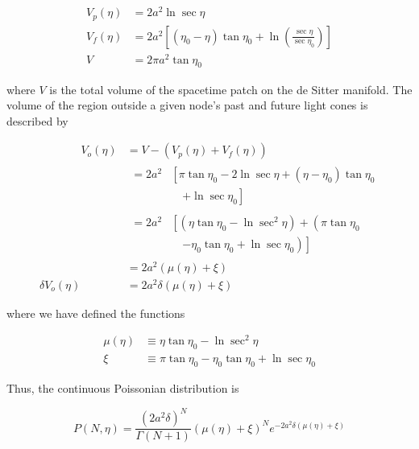 \documentclass[12pt]{article}
\begin{document}
\begin{equation}
\begin{split}
V_p\left(\eta\right) &= 2a^2\ln\sec\eta \\
V_f\left(\eta\right) &= 2a^2\left[\left(\eta_0-\eta\right)\tan\eta_0 + \ln\left(\frac{\sec\eta}{\sec\eta_0}\right)\right] \\
V &= 2\pi a^2 \tan\eta_0
\end{split}
\end{equation}

where $V$ is the total volume of the spacetime patch on the de Sitter manifold.  The volume of the region outside a given node's past and future light cones is described by

\begin{align}
\phantom{\delta V_0\left(\eta\right)}
V_o\left(\eta\right) &= V - \left(V_p\left(\eta\right)+V_f\left(\eta\right)\right) \\
  &\begin{aligned}
    = 2a^2 & \left[\pi\tan\eta_0 - 2\ln\sec\eta + \left(\eta-\eta_0\right)\tan\eta_0 \right. \\
    & \quad \left. + \ln\sec\eta_0 \right]
  \end{aligned} \\
  &\begin{aligned}
    = 2a^2 & \left[\left(\eta\tan\eta_0 - \ln\sec^2\eta\right) + \left(\pi\tan\eta_0 \right. \right. \\
    & \quad \left. \left. -\eta_0\tan\eta_0 + \ln\sec\eta_0\right)\right]
  \end{aligned} \\
  &= 2a^2 \left(\mu\left(\eta\right) + \xi\right) \\
\delta V_o\left(\eta\right) &= 2a^2\delta\left(\mu\left(\eta\right) + \xi\right)
\end{align}

where we have defined the functions

\begin{equation}
\begin{split}
\mu\left(\eta\right) &\equiv \eta\tan\eta_0 - \ln\sec^2\eta \\
\xi & \equiv \pi\tan\eta_0 - \eta_0\tan\eta_0 + \ln\sec\eta_0
\end{split}
\end{equation}

Thus, the continuous Poissonian distribution is

\begin{equation}
P\left(N\comma \eta\right) = \frac{\left(2a^2\delta\right)^N}{\Gamma\left(N+1\right)}\left(\mu\left(\eta\right) + \xi\right)^N e^{-2a^2\delta\left(\mu\left(\eta\right) + \xi\right)}
\end{equation}
\end{document}
